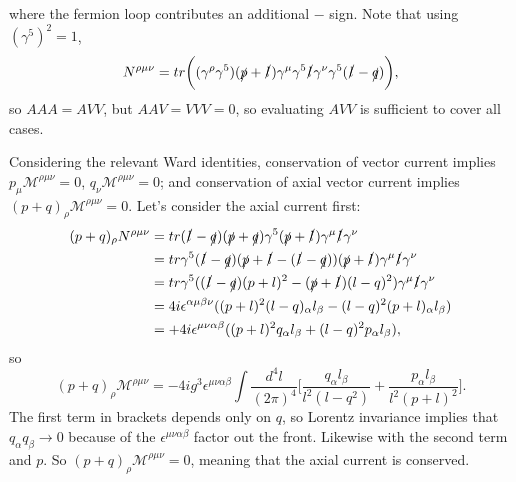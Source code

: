 where the fermion loop contributes an additional $-$ sign. Note that using $(\gamma^5)^2=1$,
\begin{equation}
N^{\rho \mu \nu} = tr\bigg((\gamma^\rho \gamma^5)(\slashed{p} + \slashed{l})\gamma^\mu \gamma^5 \slashed{l} \gamma^\nu \gamma^5 (\slashed{l} - \slashed{q})\bigg),
\end{equation}
so $AAA=AVV$, but $AAV=VVV=0$, so evaluating $AVV$ is sufficient to cover all cases. 

Considering the relevant Ward identities, conservation of vector current implies $p_\mu \mathcal{M}^{\rho \mu \nu}=0$, $q_\nu \mathcal{M}^{\rho \mu \nu}=0$; and conservation of axial vector current implies $(p+q)_\rho \mathcal{M}^{\rho \mu \nu} = 0$. Let's consider the axial current first:
\begin{equation}
\begin{split}
(p+q)_\rho N^{\rho \mu \nu} &=  tr(\slashed{l}-\slashed{q})(\slashed{p} + \slashed{q})\gamma^5(\slashed{p}+\slashed{l})\gamma^\mu \slashed{l} \gamma^\nu \\
&= tr \gamma^5(\slashed{l}-\slashed{q})(\slashed{p}+\slashed{l}-(\slashed{l}-\slashed{q}))(\slashed{p}+\slashed{l})\gamma^\mu \slashed{l} \gamma^\nu \\
&= tr \gamma^5((\slashed{l}-\slashed{q})(p+l)^2-(\slashed{p}+\slashed{l})(l-q)^2)\gamma^\mu \slashed{l} \gamma^\nu \\
&= 4i\epsilon^{\alpha \mu \beta \nu}((p+l)^2(l-q)_\alpha l_\beta - (l-q)^2(p+l)_\alpha l_\beta) \\
&= +4i\epsilon^{\mu \nu \alpha \beta}((p+l)^2 q_\alpha l_\beta + (l-q)^2 p_\alpha l_\beta),
\end{split}
\end{equation}
so
\begin{equation}
(p+q)_\rho \mathcal{M}^{\rho \mu \nu} = -4ig^3 \epsilon^{\mu \nu \alpha \beta}\int \frac{d^4l}{(2\pi)^4} \bigg[ \frac{q_\alpha l_\beta}{l^2(l-q^2)} + \frac{p_\alpha l_\beta}{l^2(p+l)^2} \bigg].
\end{equation}
The first term in brackets depends only on $q$, so Lorentz invariance implies that $q_\alpha q_\beta \to 0$ because of the $\epsilon^{\mu\nu\alpha\beta}$ factor out the front.  Likewise with the second term and $p$. So $(p+q)_\rho \mathcal{M}^{\rho \mu \nu} = 0$, meaning that the axial current is conserved. 

